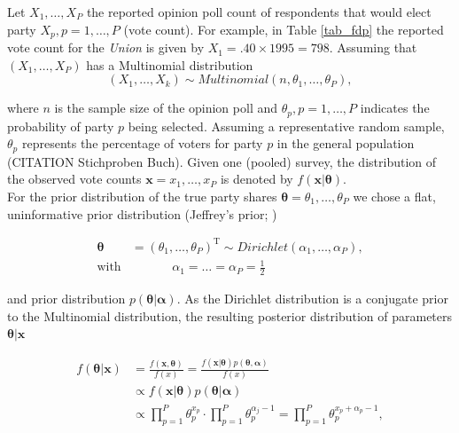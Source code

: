 \documentclass[smallcondensed]{svjour3}     %
\newcommand{\T}{\mathrm{\scriptscriptstyle T}}
\begin{document}
Let $X_1,\ldots, X_P$ the reported opinion poll count of respondents that would
elect party $X_p, p=1,\ldots,P$ (vote count). For example, in Table \ref{tab_fdp}
the reported vote count for the \emph{Union} is given by $X_1 = .40 \times 1995 = 798$.
Assuming that $(X_1, \ldots, X_P)$ has a Multinomial distribution
\begin{equation}\label{eq:multinom}
(X_1,\ldots, X_k) \sim Multinomial(n, \theta_1,\ldots, \theta_P),
\end{equation}

where $n$ is the sample size of the opinion poll and $\theta_p, p=1,\ldots,P$
indicates the probability of party $p$ being selected. Assuming a representative
random sample, $\theta_p$ represents the percentage of voters for party $p$ in
the general population (CITATION Stichproben Buch). Given one (pooled) survey,
the distribution of the observed vote counts $\mathbf{x}=x_1,\ldots,x_P$ is
denoted by $f(\mathbf{x}|\boldsymbol{\theta})$.\\

For the prior distribution of the true party shares $\boldsymbol{\theta}=\theta_1,\ldots, \theta_P$
we chose a flat, uninformative prior distribution
(Jeffrey's prior; \citet{gelman_2013})

\begin{equation}\label{eq:prior}
\begin{aligned}
\boldsymbol{\theta} &= (\theta_1,\ldots,\theta_P)^\T \sim Dirichlet(\alpha_1,\ldots,\alpha_P), \\
\text{with} &\ \ \ \ \ \ \ \ \ \ \ \ \ \ \ \alpha_1 = \ldots = \alpha_P = \frac{1}{2}
\end{aligned}
\end{equation}

and prior distribution $p(\boldsymbol{\theta}|\boldsymbol{\alpha})$.
As the Dirichlet distribution is a conjugate prior to the Multinomial distribution,
the resulting posterior distribution of parameters $\boldsymbol{\theta}|\mathbf{x}$

\begin{align}
f(\boldsymbol{\theta}|\mathbf{x})
  & = \frac{f(\mathbf{x}, \boldsymbol{\theta})}{f(x)}
    = \frac{f(\mathbf{x}|\boldsymbol{\theta})p(\boldsymbol{\theta}, \boldsymbol{\alpha})}{f(x)}\\
  & \propto f(\mathbf{x}|\boldsymbol{\theta})p(\boldsymbol{\theta}|\boldsymbol{\alpha})\\
  & \propto \prod_{p=1}^{P}\theta_p^{x_p}\cdot \prod_{p=1}^{P}\theta_p^{\alpha_{j}-1} = \prod_{p=1}^{P}\theta_p^{x_p + \alpha_p-1},
\end{align}
\end{document}
